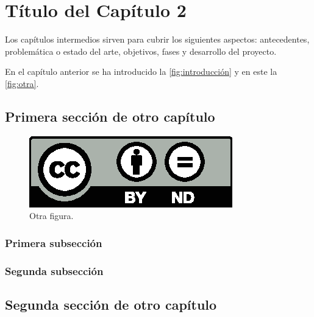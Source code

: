 \chapter{Título del Capítulo 2}
\label{ch:capítulo-dos}

Los capítulos intermedios sirven para cubrir los siguientes aspectos: antecedentes, problemática o estado del arte, objetivos, fases y desarrollo del proyecto.

En el capítulo anterior se ha introducido la \autoref{fig:introducción} y en este la \autoref{fig:otra}. 

\section{Primera sección de otro capítulo}
\label{sec:primera_sección}

\begin{figure}[htbp]
   \centering
   \includegraphics[width=0.5\linewidth]{images/licenses/by-nd}
   \caption{Otra figura.}
   \label{fig:otra}
\end{figure}

\lipsum[3]

\subsection{Primera subsección}

\lipsum[4]

\subsection{Segunda subsección}

\lipsum[5]

\section{Segunda sección de otro capítulo}

\lipsum[6-7]


